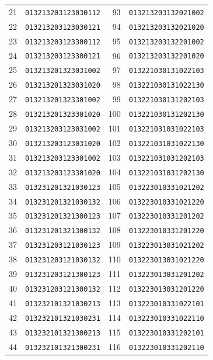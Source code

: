 \documentclass[aps,pra,reprint,superscriptaddress,longbibliography,nofootinbib,floatfix,10pt]{revtex4-2}
\theoremstyle{definition}
\begin{document}
\begin{longtable}{rl@{\qquad}rl}
21 & \texttt{013213203123030112} & 93 & \texttt{013213203132021002}\\
22 & \texttt{013213203123030121} & 94 & \texttt{013213203132021020}\\
23 & \texttt{013213203123300112} & 95 & \texttt{013213203132201002}\\
24 & \texttt{013213203123300121} & 96 & \texttt{013213203132201020}\\
25 & \texttt{013213201323031002} & 97 & \texttt{013221030131022103}\\
26 & \texttt{013213201323031020} & 98 & \texttt{013221030131022130}\\
27 & \texttt{013213201323301002} & 99 & \texttt{013221030131202103}\\
28 & \texttt{013213201323301020} & 100 & \texttt{013221030131202130}\\
29 & \texttt{013213203123031002} & 101 & \texttt{013221031031022103}\\
30 & \texttt{013213203123031020} & 102 & \texttt{013221031031022130}\\
31 & \texttt{013213203123301002} & 103 & \texttt{013221031031202103}\\
32 & \texttt{013213203123301020} & 104 & \texttt{013221031031202130}\\
33 & \texttt{013231201321030123} & 105 & \texttt{013223010331021202}\\
34 & \texttt{013231201321030132} & 106 & \texttt{013223010331021220}\\
35 & \texttt{013231201321300123} & 107 & \texttt{013223010331201202}\\
36 & \texttt{013231201321300132} & 108 & \texttt{013223010331201220}\\
37 & \texttt{013231203121030123} & 109 & \texttt{013223013031021202}\\
38 & \texttt{013231203121030132} & 110 & \texttt{013223013031021220}\\
39 & \texttt{013231203121300123} & 111 & \texttt{013223013031201202}\\
40 & \texttt{013231203121300132} & 112 & \texttt{013223013031201220}\\
41 & \texttt{013232101321030213} & 113 & \texttt{013223010331022101}\\
42 & \texttt{013232101321030231} & 114 & \texttt{013223010331022110}\\
43 & \texttt{013232101321300213} & 115 & \texttt{013223010331202101}\\
44 & \texttt{013232101321300231} & 116 & \texttt{013223010331202110}\\

\end{longtable}
\end{document}
